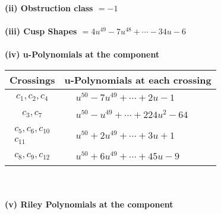 \documentclass[1p]{elsarticle_modified}
\theoremstyle{definition}
\begin{document}
\flushleft \textbf{(ii) Obstruction class $= -1$}\\~\\
\flushleft \textbf{(iii) Cusp Shapes $= 4 u^{49}-7 u^{48}+\cdots-34 u-6$}\\~\\
\newpage\renewcommand{\arraystretch}{1}
\flushleft \textbf{(iv) u-Polynomials at the component}\newline \\
\begin{tabular}{m{50pt}|m{274pt}}
Crossings & \hspace{64pt}u-Polynomials at each crossing \\
\hline $$\begin{aligned}c_{1},c_{2},c_{4}\end{aligned}$$&$\begin{aligned}
&u^{50}-7 u^{49}+\cdots+2 u-1
\end{aligned}$\\
\hline $$\begin{aligned}c_{3},c_{7}\end{aligned}$$&$\begin{aligned}
&u^{50}- u^{49}+\cdots+224 u^2-64
\end{aligned}$\\
\hline $$\begin{aligned}c_{5},c_{6},c_{10}\\c_{11}\end{aligned}$$&$\begin{aligned}
&u^{50}+2 u^{49}+\cdots+3 u+1
\end{aligned}$\\
\hline $$\begin{aligned}c_{8},c_{9},c_{12}\end{aligned}$$&$\begin{aligned}
&u^{50}+6 u^{49}+\cdots+45 u-9
\end{aligned}$\\
\hline
\end{tabular}\\~\\
\newpage\renewcommand{\arraystretch}{1}
\flushleft \textbf{(v) Riley Polynomials at the component}\newline \\
\end{document}
